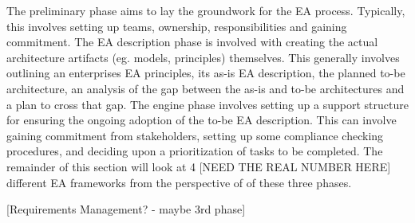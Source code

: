 The preliminary phase aims to lay the groundwork for the EA process. Typically, this involves setting up teams, ownership, responsibilities and gaining commitment. The EA description phase is involved with creating the actual architecture artifacts (eg. models, principles) themselves. This generally involves outlining an enterprises EA principles, its as-is EA description,  the planned to-be architecture, an analysis of the gap between the as-is and to-be architectures and a plan to cross that gap. The engine  phase involves setting up a support structure for ensuring the ongoing adoption of the to-be EA description. This can involve gaining commitment from stakeholders, setting up some compliance checking procedures, and deciding upon a prioritization of tasks to be completed. The remainder of this section will look at 4 [NEED THE REAL NUMBER HERE] different EA frameworks from the perspective of of these three phases. 

[Requirements Management? - maybe 3rd phase]

% 
% 
% 

% 

